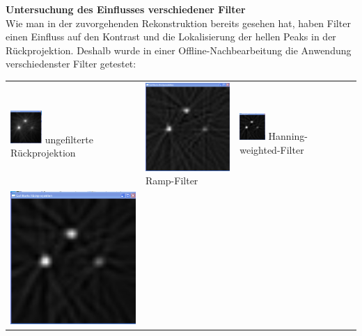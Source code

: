     	            \textbf{Untersuchung des Einflusses verschiedener Filter}\\
    	            
    	            Wie man in der zuvorgehenden Rekonstruktion bereits gesehen hat, haben Filter einen Einfluss auf den Kontrast und die Lokalisierung der hellen Peaks in der Rückprojektion. Deshalb wurde in einer Offline-Nachbearbeitung die Anwendung verschiedenster Filter getestet:
    	            \begin{center}
    	              \begin{longtable}{p{4.0cm}p{4.0cm}p{4.0cm}l}
    	                  \includegraphics[width=0.25\textwidth, height=0.15\textheight]{pic/Einzelfenster_Bilder/unbekannte_Quelle/unbek5_einf_prj.png}
    	                  ungefilterte Rückprojektion
    	                  & 
    	                  \includegraphics[width=.25\textwidth, height=0.15\textheight]{pic/Einzelfenster_Bilder/unbekannte_Quelle/unbek5_ramp.png}
    	                  Ramp-Filter
    	                  &
    	                  \includegraphics[width=0.25\textwidth, height=0.15\textheight]{pic/Einzelfenster_Bilder/unbekannte_Quelle/unbek5_hanning_weighted.png}
    	                  Hanning-weighted-Filter\\
    	                  \includegraphics[width=.25\textwidth, height=0.15\textheight]{pic/Einzelfenster_Bilder/unbekannte_Quelle/unbek5_middle.png} 

\end{longtable}
\end{center}
